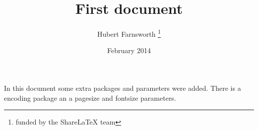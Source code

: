 \documentclass[12pt, letterpaper, twoside]{article}
\title{First document}
\author{Hubert Farnsworth \thanks{funded by the ShareLaTeX team}}
\date{February 2014}
\begin{document}
 
\begin{titlepage}
\maketitle
\end{titlepage}
 
In this document some extra packages and parameters
were added. There is a encoding package
an a pagesize and fontsize parameters.
 
\end{document}
